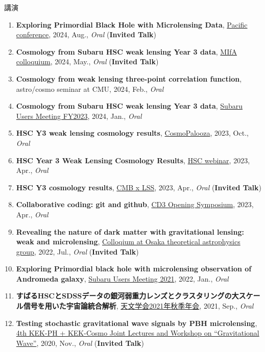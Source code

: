 \begin{rSection}{講演}
\begin{enumerate}[itemsep=0pt, parsep=0pt, topsep=0pt, partopsep=0pt]
\item \textbf{Exploring Primordial Black Hole with Microlensing Data}, \href{https://pacific-conference.pa.ucla.edu/index.html}{Pacific conference}, 2024, Aug., \textit{Oral} (\textbf{Invited Talk})
\item \textbf{Cosmology from Subaru HSC weak lensing Year 3 data}, \href{https://cse.umn.edu/physics/minnesota-institute-astrophysics-mifa-colloquium}{MIfA colloquium}, 2024, May., \textit{Oral} (\textbf{Invited Talk})
\item \textbf{Cosmology from weak lensing three-point correlation function}, astro/cosmo seminar at CMU, 2024, Feb., \textit{Oral}
\item \textbf{Cosmology from Subaru HSC weak lensing Year 3 data}, \href{https://www.subarutelescope.org/Science/SubaruUM/SubaruUM2023/index.html}{Subaru Users Meeting FY2023}, 2024, Jan., \textit{Oral}
\item \textbf{HSC Y3 weak lensing cosmology results}, \href{https://cosmopalooza.lbl.gov/}{CosmoPalooza}, 2023, Oct., \textit{Oral}
\item \textbf{HSC Year 3 Weak Lensing Cosmology Results}, \href{https://hsc-release.mtk.nao.ac.jp/doc/index.php/wly3/}{HSC webinar}, 2023, Apr., \textit{Oral}
\item \textbf{HSC Y3 cosmology results}, \href{https://www2.yukawa.kyoto-u.ac.jp/~cmb-lss/index.php}{CMB x LSS}, 2023, Apr., \textit{Oral} (\textbf{Invited Talk})
\item \textbf{Collaborative coding: git and github}, \href{https://cd3.ipmu.jp/opening/}{CD3 Opening Symposium}, 2023, Apr., \textit{Oral}
\item \textbf{Revealing the nature of dark matter with gravitational lensing: weak and microlensing}, \href{http://astro-osaka.jp/OUTAP/colloquium-abstracts.html#sugiyama}{Colloqium at Osaka theoretical astrophysics group}, 2022, Jul., \textit{Oral} (\textbf{Invited Talk})
\item \textbf{Exploring Primordial black hole with microlensing observation of Andromeda galaxy}, \href{https://subarutelescope.org/Science/SubaruUM/SubaruUM2021/}{Subaru Users Meeting 2021}, 2022, Jan., \textit{Oral}
\item \textbf{すばるHSCとSDSSデータの銀河弱重力レンズとクラスタリングの大スケール信号を用いた宇宙論統合解析}, \href{https://www.asj.or.jp/nenkai/archive/2021b/pdf/U05a.pdf}{天文学会2021年秋季年会}, 2021, Sep., \textit{Oral}
\item \textbf{Testing stochastic gravitational wave signals by PBH microlensing}, \href{http://conference-indico.kek.jp/event/117/timetable/#day-2020-11-04}{4th KEK-PH + KEK-Cosmo Joint Lectures and Workshop on ``Gravitational Wave''}, 2020, Nov., \textit{Oral} (\textbf{Invited Talk})
\end{enumerate}\end{rSection}

